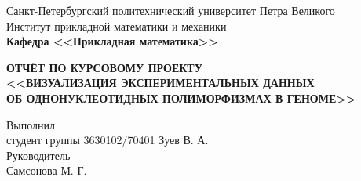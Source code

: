 \documentclass[main.tex]{subfiles}
\begin{document}
\begin{titlepage}
\begin{center}
	\begin{large}
		Санкт-Петербургский политехнический университет Петра Великого\\
		Институт прикладной математики и механики\\
		\textbf{Кафедра <<Прикладная математика>>}\\
	\end{large}
	\vfill
	\Large{\textbf{ОТЧЁТ ПО КУРСОВОМУ ПРОЕКТУ\\
	<<ВИЗУАЛИЗАЦИЯ ЭКСПЕРИМЕНТАЛЬНЫХ ДАННЫХ \\
	ОБ ОДНОНУКЛЕОТИДНЫХ ПОЛИМОРФИЗМАХ В ГЕНОМЕ>>}} \normalsize
\end{center}
\vfill
\flushleft
Выполнил\\
студент группы 3630102/70401
\flushright
Зуев В. А.\\ 
\flushleft
Руководитель\\
\flushright
Самсонова М. Г.
\flushleft
\vfill
{}
\end{titlepage}
\end{document}
